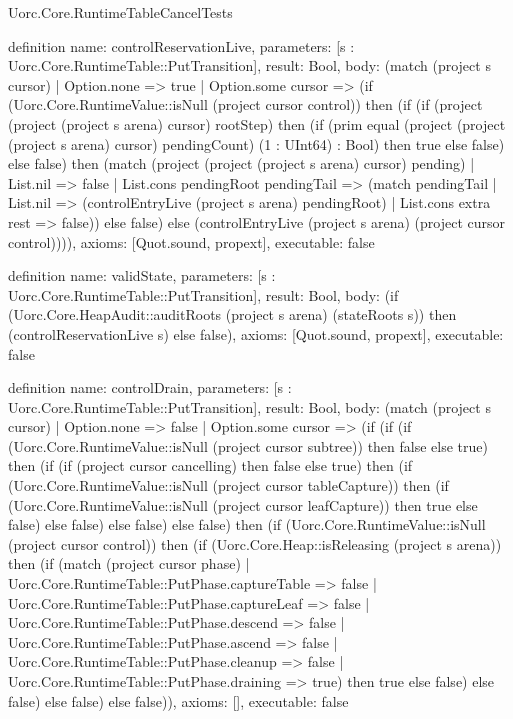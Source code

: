 \begin{lexlean}{Uorc.Core.RuntimeTableCancelTests}
\begin{semanticmodule}
definition{
  name: controlReservationLive,
  parameters: [s : Uorc.Core.RuntimeTable::PutTransition],
  result: Bool,
  body: (match (project s cursor)
    | Option.none => true
    | Option.some cursor => (if (Uorc.Core.RuntimeValue::isNull (project cursor control)) then (if (if (project (project (project s arena) cursor) rootStep) then (if (prim equal (project (project (project s arena) cursor) pendingCount) (1 : UInt64) : Bool) then true else false) else false) then (match (project (project (project s arena) cursor) pending)
      | List.nil => false
      | List.cons pendingRoot pendingTail => (match pendingTail
        | List.nil => (controlEntryLive (project s arena) pendingRoot)
        | List.cons extra rest => false)) else false) else (controlEntryLive (project s arena) (project cursor control)))),
  axioms: [Quot.sound, propext],
  executable: false
}

definition{
  name: validState,
  parameters: [s : Uorc.Core.RuntimeTable::PutTransition],
  result: Bool,
  body: (if (Uorc.Core.HeapAudit::auditRoots (project s arena) (stateRoots s)) then (controlReservationLive s) else false),
  axioms: [Quot.sound, propext],
  executable: false
}

definition{
  name: controlDrain,
  parameters: [s : Uorc.Core.RuntimeTable::PutTransition],
  result: Bool,
  body: (match (project s cursor)
    | Option.none => false
    | Option.some cursor => (if (if (if (Uorc.Core.RuntimeValue::isNull (project cursor subtree)) then false else true) then (if (if (project cursor cancelling) then false else true) then (if (Uorc.Core.RuntimeValue::isNull (project cursor tableCapture)) then (if (Uorc.Core.RuntimeValue::isNull (project cursor leafCapture)) then true else false) else false) else false) else false) then (if (Uorc.Core.RuntimeValue::isNull (project cursor control)) then (if (Uorc.Core.Heap::isReleasing (project s arena)) then (if (match (project cursor phase)
      | Uorc.Core.RuntimeTable::PutPhase.captureTable => false
      | Uorc.Core.RuntimeTable::PutPhase.captureLeaf => false
      | Uorc.Core.RuntimeTable::PutPhase.descend => false
      | Uorc.Core.RuntimeTable::PutPhase.ascend => false
      | Uorc.Core.RuntimeTable::PutPhase.cleanup => false
      | Uorc.Core.RuntimeTable::PutPhase.draining => true) then true else false) else false) else false) else false)),
  axioms: [],
  executable: false
}


\end{semanticmodule}
\end{lexlean}

